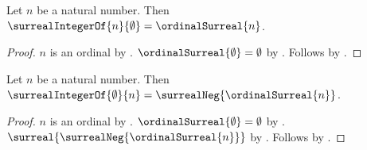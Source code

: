 \begin{proposition}\label{surreal_integer_positive_presentation}
    Let $n$ be a natural number.
    Then $\surrealIntegerOf{n}{\emptyset}=\ordinalSurreal{n}$.
\end{proposition}
\begin{proof}
    $n$ is an ordinal by .
    $\ordinalSurreal{\emptyset}=\emptyset$
        by .
    Follows by
        .
\end{proof}

\begin{proposition}\label{surreal_integer_negative_presentation}
    Let $n$ be a natural number.
    Then $\surrealIntegerOf{\emptyset}{n}
        =\surrealNeg{\ordinalSurreal{n}}$.
\end{proposition}
\begin{proof}
    $n$ is an ordinal by .
    $\ordinalSurreal{\emptyset}=\emptyset$
        by .
    $\surreal{\surrealNeg{\ordinalSurreal{n}}}$
        by .
    Follows by .
\end{proof}

